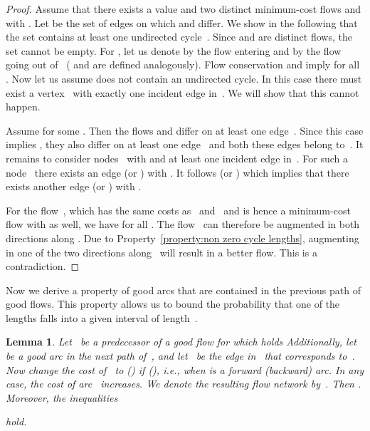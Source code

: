 \documentclass[11pt]{article}
\newtheorem{lemma}[theorem]{Lemma}
\begin{document}
\begin{proof}
Assume that there exists a value  and two distinct minimum-cost flows  and  with . Let  be the set of edges on which  and  differ. We show in the following that the set  contains at least one undirected cycle~.
Since  and  are distinct flows, the set  cannot be empty. For , let us denote by  the flow entering  and by  the flow going out of~ ( and  are defined analogously). Flow conservation and  imply  for all . 
Now let us assume  does not contain an undirected cycle. In this case there must exist a vertex~ with exactly one incident edge in~. We will show that this cannot happen.

Assume  for some . Then the flows  and  differ on at least one edge~. Since this case implies , they also differ on at least one edge~ and both these edges belong to~. It remains to consider nodes~ with  and at least one incident edge in~. For such a node~ there exists an edge  (or ) with . It follows  (or ) which implies that there exists another edge  (or ) with .

For the flow~, which has the same costs as~ and~ and is hence a minimum-cost flow with  as well, we have  for all . The flow~ can therefore be augmented in both directions along . Due to Property~\ref{property:non zero cycle lengths}, augmenting  in one of the two directions along~ will result in a better flow. This is a contradiction.
\end{proof}

Now we derive a property of good arcs that are contained in the previous path of good flows.
This property allows us to bound the probability that one of the lengths  falls into a given interval of length~.

\begin{lemma}
\label{lemma:cost monotonicity}
Let~ be a predecessor of a good flow for which  holds Additionally, let~ be a good arc in the next path of~, and let~ be the edge in~ that corresponds to~. Now change the cost of~ to  () if  (), i.e., when  is a forward (backward) arc. In any case, the cost of arc~ increases. We denote the resulting flow network by~. Then . Moreover, the inequalities

hold.
\end{lemma}
\end{document}
